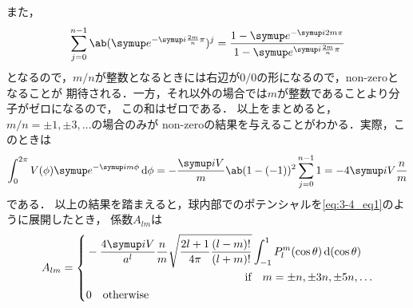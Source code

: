   また，
  \begin{gather}%
    \sum_{j=0}^{n-1} \ab(\e^{-\i\frac{2m}{n}\pi})^j 
    = \frac{1 - \e^{-\i 2m\pi}}{1-\e^{\i \frac{2m}{n}\pi}}
  \end{gather}%
  となるので，$m/n$が整数となるときには右辺が$0 / 0$の形になるので，non-zeroとなることが
  期待される．一方，それ以外の場合では$m$が整数であることより分子がゼロになるので，
  この和はゼロである．
  以上をまとめると，$m / n = \pm1, \pm3, \ldots$の場合のみが
  non-zeroの結果を与えることがわかる．実際，このときは
  \begin{gather}%
    \int_0^{2\pi} V(\phi) \e^{-\i m\phi} \dl{\phi} =
    -\frac{\i V}{m}\ab(1-(-1))^2 \sum_{j=0}^{n-1} 1 = -4\i V \frac{n}{m}
  \end{gather}%
  である．
  以上の結果を踏まえると，球内部でのポテンシャルを\eqref{eq:3-4_eq1}のように展開したとき，
  係数$A_{lm}$は
  \begin{gather}%
    A_{lm} = 
    \begin{dcases}%
      \begin{multlined}
        -\frac{4\i V}{a^l}\frac{n}{m} \sqrt{\frac{2l+1}{4\pi}\frac{(l-m)!}{(l+m)!}} 
        \int_{-1}^1 P_l^m (\cos\theta)\dl{(\cos\theta)} \\
        \qqtext{if} m = \pm n, \pm 3n, \pm 5n, \ldots
      \end{multlined}\\
      0 \qqtext{otherwise}
    \end{dcases}%
  \end{gather}%

